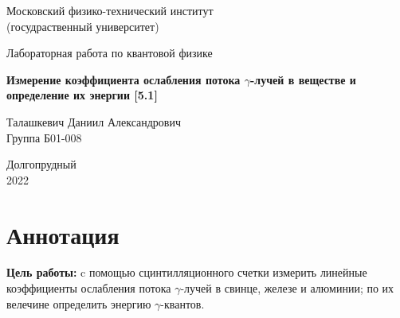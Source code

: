 \documentclass[a4paper, 12pt]{article}%
\begin{document}


\begin{titlepage}

	\newpage
	\begin{center}
		\normalsize Московский физико-технический институт \\(госудраственный 			университет)
	\end{center}

	\vspace{6em}

	\begin{center}
		\Large Лабораторная работа по квантовой физике\\
	\end{center}

	\vspace{1em}

	\begin{center}
		\large \textbf{Измерение коэффициента ослабления потока $\gamma$-лучей в веществе и определение их энергии [5.1]}
	\end{center}

	\vspace{2em}

	\begin{center}
		\large Талашкевич Даниил Александрович\\
		Группа Б01-008
	\end{center}

	\vspace{\fill}

	\begin{center}
	Долгопрудный \\2022
	\end{center}
	
\end{titlepage}



	\thispagestyle{empty}
	\newpage
	\tableofcontents
	\newpage
	\setcounter{page}{1}



\section{Аннотация}

	\textbf{Цель работы:} c помощью сцинтилляционного счетки измерить линейные коэффициенты ослабления потока $\gamma$-лучей в свинце, железе и алюминии; по их велечине определить энергию $\gamma$-квантов.
\end{document}
